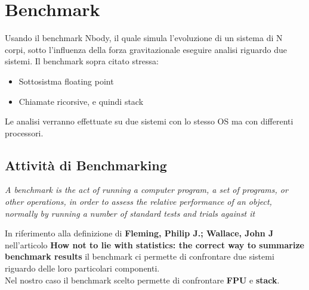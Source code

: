 \chapter{Benchmark}
Usando il benchmark Nbody, il quale simula l'evoluzione di un sistema di N corpi, sotto l'influenza della forza gravitazionale eseguire analisi riguardo due sistemi.
Il benchmark sopra citato stressa:
\begin{itemize}
    \item Sottosistma floating point
    \item Chiamate ricorsive, e quindi stack
\end{itemize}
Le analisi verranno effettuate su due sistemi con lo stesso OS ma con differenti processori.
\section{Attività di Benchmarking}
\begin{center}
    \textit{ A benchmark is the act of running a computer program, a set of programs, or other operations, in order to assess the relative performance of an object, normally by running a number of standard tests and trials against it}
\end{center}
In riferimento alla definizione di \textbf{Fleming, Philip J.; Wallace, John J} nell'articolo \textbf{How not to lie with statistics: the correct way to summarize benchmark results} il benchmark ci permette di confrontare due sistemi riguardo delle loro particolari componenti.\\
Nel nostro caso il benchmark scelto permette di confrontare \textbf{FPU} e \textbf{stack}.
